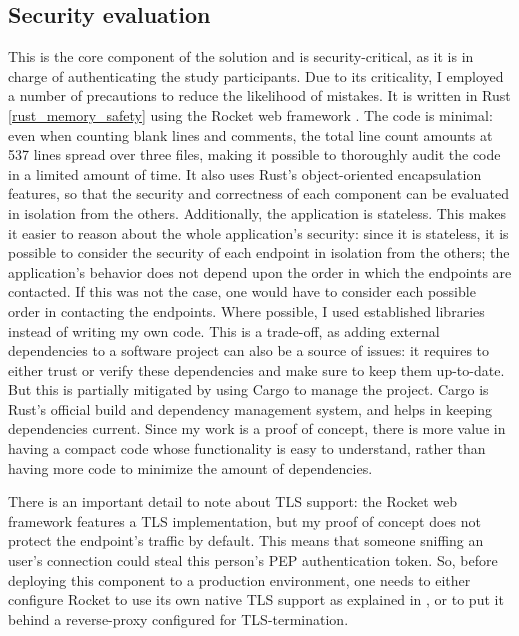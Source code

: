 \documentclass{report}
\begin{document}
\subsection{Security evaluation}
This is the core component of the solution and is security-critical, as it is in charge of authenticating the study participants.  Due to its criticality, I employed a number of
precautions to reduce the likelihood of mistakes. It is written in Rust \ref{rust_memory_safety} using the Rocket web framework \cite{rocket}.  The code is minimal: even when
counting blank lines and comments, the total line count amounts at 537 lines spread over three files, making it possible to thoroughly audit the code in a limited amount of time. It
also uses Rust's object-oriented encapsulation features, so that the security and correctness of each component can be evaluated in isolation from the others. Additionally, the
application is stateless. This makes it easier to reason about the whole application's security: since it is stateless, it is possible to consider the security of each endpoint in
isolation from the others; the application's behavior does not depend upon the order in which the endpoints are contacted. If this was not the case, one would have to consider each
possible order in contacting the endpoints. Where possible, I used established libraries instead of writing my own code. This is a trade-off, as adding external dependencies to a
software project can also be a source of issues: it requires to either trust or verify these dependencies and make sure to keep them up-to-date. But this is partially mitigated by
using Cargo \cite{cargo} to manage the project. Cargo is Rust's official build and dependency management system, and helps in keeping dependencies current. Since my work is a proof of concept,
there is more value in having a compact code whose functionality is easy to understand, rather than having more code to minimize the amount of dependencies.\par
There is an important detail to note about TLS support: the Rocket web framework features a TLS implementation, but my proof of concept does not protect the endpoint's traffic by
default. This means that someone sniffing an user's connection could steal this person's PEP authentication token. So, before deploying this component to a production environment,
one needs to either configure Rocket to use its own native TLS support as explained in \cite{rocket_guide_tls}, or to put it behind a reverse-proxy configured for TLS-termination.
\par
\end{document}
